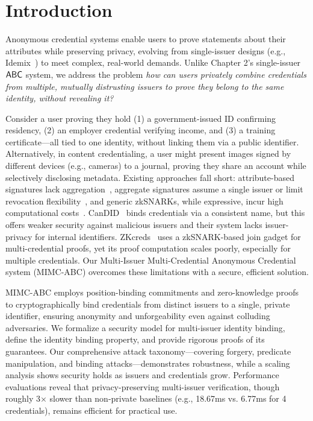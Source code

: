 \label{sec:mimc}

\section{Introduction}
Anonymous credential systems enable users to prove statements about their attributes while preserving privacy, evolving from single-issuer designs (e.g., Idemix~\cite{camenisch_design_2002}) to meet complex, real-world demands. Unlike Chapter 2's single-issuer $\mathsf{ABC}$ system, we address the problem \emph{how can users privately combine credentials from multiple, mutually distrusting issuers to prove they belong to the same identity, without revealing it?}

Consider a user proving they hold (1) a government-issued ID confirming residency, (2) an employer credential verifying income, and (3) a training certificate—all tied to one identity, without linking them via a public identifier. Alternatively, in content credentialing, a user might present images signed by different devices (e.g., cameras) to a journal, proving they share an account while selectively disclosing metadata. Existing approaches fall short: attribute-based signatures lack aggregation~\cite{cimato_signature_2003}, aggregate signatures assume a single issuer \cite{goos_short_2001, hutchison_short_2004} or limit revocation flexibility~\cite{hebant_traceable_nodate}, and generic zkSNARKs, while expressive, incur high computational costs~\cite{rosenberg_zk-creds_2022}. CanDID~\cite{maram2021candid} binds credentials via a consistent name, but this offers weaker security against malicious issuers and their system lacks issuer-privacy for internal identifiers. ZKcreds~\cite{rosenberg_zk-creds_2022} uses a zkSNARK-based join gadget for multi-credential proofs, yet its proof computation scales poorly, especially for multiple credentials. Our Multi-Issuer Multi-Credential Anonymous Credential system (MIMC-ABC) overcomes these limitations with a secure, efficient solution.

MIMC-ABC employs position-binding commitments and zero-knowledge proofs to cryptographically bind credentials from distinct issuers to a single, private identifier, ensuring anonymity and unforgeability even against colluding adversaries. We formalize a security model for multi-issuer identity binding, define the identity binding property, and provide rigorous proofs of its guarantees. Our comprehensive attack taxonomy—covering forgery, predicate manipulation, and binding attacks—demonstrates robustness, while a scaling analysis shows security holds as issuers and credentials grow. Performance evaluations reveal that privacy-preserving multi-issuer verification, though roughly 3× slower than non-private baselines (e.g., 18.67ms vs. 6.77ms for 4 credentials), remains efficient for practical use.

